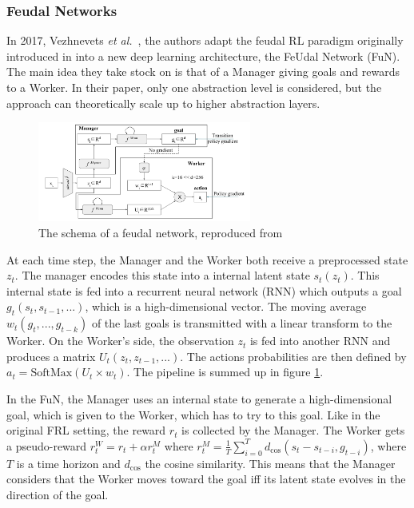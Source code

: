 \documentclass{article}
\newcommand{\etal}{\textit{et al.}}
\begin{document}
\subsubsection{Feudal Networks}

In 2017, Vezhnevets \etal~\cite{vezhnevets_feudal_2017}, the authors adapt the feudal RL paradigm originally introduced in \cite{dayan_feudal_1993} into a new deep learning architecture, the FeUdal Network (FuN). The main idea they take stock on is that of a Manager giving goals and rewards to a Worker. In their paper, only one abstraction level is considered, but the approach can theoretically scale up to higher abstraction layers.

\begin{figure}
    \centering
    \includegraphics[width=7cm]{images/fun.png}
    \caption{The schema of a feudal network, reproduced from \cite{vezhnevets_feudal_2017}}
    \label{fig:fun}
\end{figure}

At each time step, the Manager and the Worker both receive a preprocessed state $z_t$. The manager encodes this state into a internal latent state $s_t(z_t)$. This internal state is fed into a recurrent neural network (RNN) which outputs a goal $g_t(s_t, s_{t-1}, ...)$, which is a high-dimensional vector. The moving average $w_t(g_t, ..., g_{t-k})$ of the last goals is transmitted with a linear transform to the Worker. On the Worker's side, the observation $z_t$ is fed into another RNN and produces a matrix $U_t(z_t, z_{t-1}, ...)$. The actions probabilities are then defined by $a_t = \mathrm{SoftMax}(U_t \times w_t)$. The pipeline is summed up in figure \ref{fig:fun}.

In the FuN, the Manager uses an internal state to generate a high-dimensional goal, which is given to the Worker, which has to try to this goal. Like in the original FRL setting, the reward $r_t$ is collected by the Manager. The Worker gets a pseudo-reward $r^W_t = r_t + \alpha r^M_t$ where $r^M_t = \frac 1T \sum_{i=0}^T d_\mathrm{cos}(s_t-s_{t-i}, g_{t-i})$, where $T$ is a time horizon and $d_\mathrm{cos}$ the cosine similarity. This means that the Manager considers that the Worker moves toward the goal iff its latent state evolves in the direction of the goal.
\end{document}
